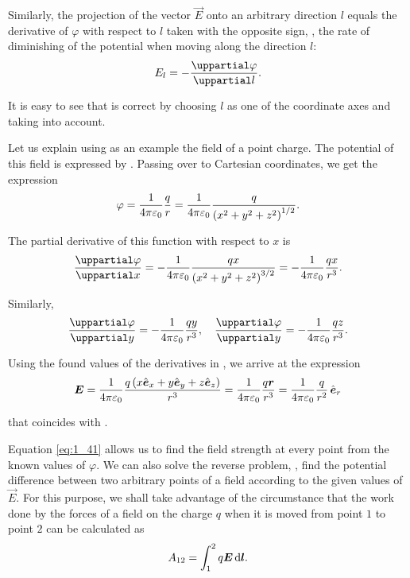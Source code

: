 \noindent
Similarly, the projection of the vector $\vec{E}$ onto an arbitrary direction $l$ equals the derivative of $\varphi$ with respect to $l$ taken with the opposite sign, \ie, the rate of diminishing of the potential when moving along the direction $l$:
\begin{equation}\label{eq:1_44}
	E_l = -\diffpartial{\varphi}{l}.
\end{equation}

\noindent
It is easy to see that  is correct by choosing $l$ as one of the coordinate axes and taking  into account.

Let us explain  using as an example the field of a point charge. The potential of this field is expressed by . Passing over to Cartesian coordinates, we get the expression
\begin{equation*}
	\varphi = \frac{1}{4\pi\varepsilon_0} \frac{q}{r} = \frac{1}{4\pi\varepsilon_0} \frac{q}{\left(x^2 + y^2 + z^2\right)^{1/2}}.
\end{equation*}

\noindent
The partial derivative of this function with respect to $x$ is
\begin{equation*}
	\diffpartial{\varphi}{x} = -\frac{1}{4\pi\varepsilon_0} \frac{qx}{\parenthesis{x^2 + y^2 + z^2}^{3/2}} = -\frac{1}{4\pi\varepsilon_0} \frac{qx}{r^3}.
\end{equation*}

\noindent
Similarly,
\begin{equation*}
	\diffpartial{\varphi}{y} = -\frac{1}{4\pi\varepsilon_0} \frac{qy}{r^3},\quad \diffpartial{\varphi}{y} = -\frac{1}{4\pi\varepsilon_0} \frac{qz}{r^3}.
\end{equation*}

\noindent
Using the found values of the derivatives in , we arrive
at the expression
\begin{equation*}
	\boldsymbol{E} = \frac{1}{4\pi\varepsilon_0} \frac{q \left(x\hat{\boldsymbol{e}}_{x}+y\hat{\boldsymbol{e}}_{y}+z\hat{\boldsymbol{e}}_{z}\right)}{r^3} = \frac{1}{4\pi\varepsilon_0} \frac{q\boldsymbol{r}}{r^3} = \frac{1}{4\pi\varepsilon_0} \frac{q}{r^2}\,\hat{\boldsymbol{e}}_{r}
\end{equation*}

\noindent
that coincides with .

Equation \eqref{eq:1_41} allows us to find the field strength at every point from the known values of $\varphi$. We can also solve the reverse problem, \ie, find the potential difference between two arbitrary points of a field according to the given values of $\vec{E}$. For this purpose, we shall take advantage of the circumstance that the work done by the forces of a field on the charge $q$ when it is moved from point $1$ to point $2$ can be calculated as
\begin{equation*}
	A_{12} = \int_1^2 q \boldsymbol{E}\, \mathrm{d}\boldsymbol{l}.
\end{equation*}

